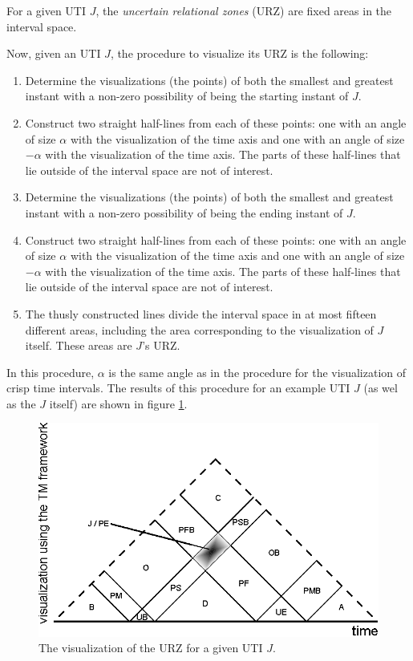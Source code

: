\begin{definition}
For a given UTI $J$, the \emph{uncertain relational zones} (URZ) are fixed areas in the interval space.
\end{definition}

Now, given an UTI $J$, the procedure to visualize its URZ is the following:


\begin{enumerate}
	\item Determine the visualizations (the points) of both the smallest and greatest instant with a non-zero possibility of being the starting instant of $J$.
	\item Construct two straight half-lines from each of these points: one with an angle of size $\alpha$ with the visualization of the time axis and one with an angle of size $-\alpha$ with the visualization of the time axis. The parts of these half-lines that lie outside of the interval space are not of interest.
	\item Determine the visualizations (the points) of both the smallest and greatest instant with a non-zero possibility of being the ending instant of $J$.
	\item Construct two straight half-lines from each of these points: one with an angle of size $\alpha$ with the visualization of the time axis and one with an angle of size $-\alpha$ with the visualization of the time axis. The parts of these half-lines that lie outside of the interval space are not of interest.
	\item The thusly constructed lines divide the interval space in at most fifteen different areas, including the area corresponding to the visualization of $J$ itself. These areas are $J$'s URZ.
\end{enumerate}

In this procedure, $\alpha$ is the same angle as in the procedure for the visualization of crisp time intervals. The results of this procedure for an example UTI $J$ (as wel as the $J$ itself) are shown in figure \ref{fig:tm-urz}. 

\begin{figure}[h]
	\centering
	\includegraphics[width=0.8\columnwidth]{graphs/TM_model_URZ.eps}
	\caption{The visualization of the URZ for a given UTI $J$.}
	\label{fig:tm-urz}
\end{figure}

